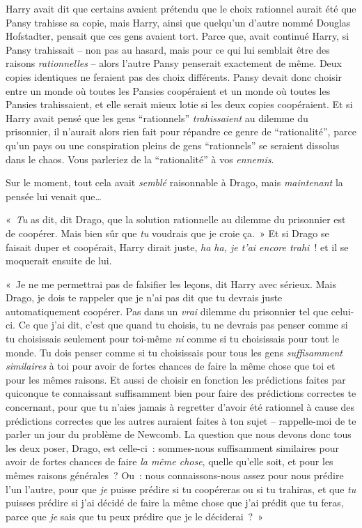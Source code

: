 Harry avait dit que certains avaient prétendu que le choix rationnel aurait été que Pansy trahisse sa copie, mais Harry, ainsi que quelqu'un d'autre nommé Douglas Hofstadter, pensait que ces gens avaient tort. Parce que, avait continué Harry, si Pansy trahissait -- non pas au hasard, mais pour ce qui lui semblait être des raisons \emph{rationnelles} -- alors l'autre Pansy penserait exactement de même. Deux copies identiques ne feraient pas des choix différents. Pansy devait donc choisir entre un monde où toutes les Pansies coopéraient et un monde où toutes les Pansies trahissaient, et elle serait mieux lotie si les deux copies coopéraient. Et si Harry avait pensé que les gens “rationnels” \emph{trahissaient} au dilemme du prisonnier, il n'aurait alors rien fait pour répandre ce genre de “rationalité”, parce qu'un pays ou une conspiration pleins de gens “rationnels” se seraient dissolus dans le chaos. Vous parleriez de la “rationalité” à vos \emph{ennemis}.

Sur le moment, tout cela avait \emph{semblé} raisonnable à Drago, mais \emph{maintenant} la pensée lui venait que…

«~\emph{Tu} as dit, dit Drago, que la solution rationnelle au dilemme du prisonnier est de coopérer. Mais bien sûr que \emph{tu} voudrais que je croie ça.~» Et si Drago se faisait duper et coopérait, Harry dirait juste, \emph{ha ha, je t'ai encore trahi}~! et il se moquerait ensuite de lui.

«~Je ne me permettrai pas de falsifier les leçons, dit Harry avec sérieux. Mais Drago, je dois te rappeler que je n'ai pas dit que tu devrais juste automatiquement coopérer. Pas dans un \emph{vrai} dilemme du prisonnier tel que celui-ci. Ce que j'ai dit, c'est que quand tu choisis, tu ne devrais pas penser comme si tu choisissais seulement pour toi-même \emph{ni} comme si tu choisissais pour tout le monde. Tu dois penser comme si tu choisissais pour tous les gens \emph{suffisamment similaires} à toi pour avoir de fortes chances de faire la même chose que toi et pour les mêmes raisons. Et aussi de choisir en fonction les prédictions faites par quiconque te connaissant suffisamment bien pour faire des prédictions correctes te concernant, pour que tu n'aies jamais à regretter d'avoir été rationnel à cause des prédictions correctes que les autres auraient faites à ton sujet -- rappelle-moi de te parler un jour du problème de Newcomb. La question que nous devons donc tous les deux poser, Drago, est celle-ci~: sommes-nous suffisamment similaires pour avoir de fortes chances de faire \emph{la même chose}, quelle qu'elle soit, et pour les mêmes raisons générales~? Ou~: nous connaissons-nous assez pour nous prédire l'un l'autre, pour que \emph{je} puisse prédire si tu coopéreras ou si tu trahiras, et que \emph{tu} puisses prédire si j'ai décidé de faire la même chose que j'ai prédit que tu feras, parce que \emph{je} sais que tu peux prédire que je le déciderai~?~»

